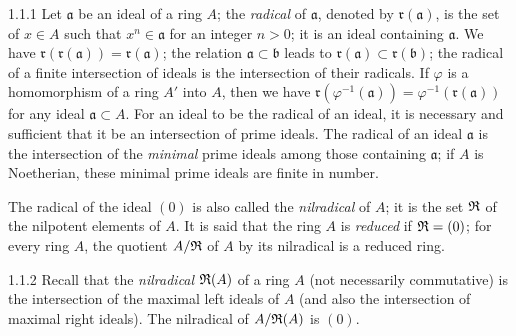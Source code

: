 
\begin{env}{1.1.1}
Let $\mathfrak{a}$ be an ideal of a ring $A$; the \emph{radical} of $\mathfrak{a}$, denoted
by $\mathfrak{r}(\mathfrak{a})$, is the set of $x\in A$ such that $x^n\in\mathfrak{a}$ for
an integer $n>0$; it is an ideal containing $\mathfrak{a}$. We have
$\mathfrak{r}(\mathfrak{r}(\mathfrak{a}))=\mathfrak{r}(\mathfrak{a})$; the relation
$\mathfrak{a}\subset\mathfrak{b}$ leads to $\mathfrak{r}(\mathfrak{a})\subset\mathfrak{r}(\mathfrak{b})$;
the radical of a finite intersection of ideals is the intersection of their radicals. If $\varphi$
is a homomorphism of a ring $A'$ into $A$, then we have
$\mathfrak{r}(\varphi^{-1}(\mathfrak{a}))=\varphi^{-1}(\mathfrak{r}(\mathfrak{a}))$
for any ideal $\mathfrak{a}\subset A$. For an ideal to be the radical of an ideal,
it is necessary and sufficient that it be an intersection of prime ideals. The radical of an
ideal $\mathfrak{a}$ is the intersection of the
\emph{minimal} prime ideals among those containing $\mathfrak{a}$; if $A$ is
Noetherian, these minimal prime ideals are finite in number.

The radical of the ideal $(0)$ is also called the \emph{nilradical} of $A$; it is the set
$\mathfrak{R}$ of the nilpotent elements of $A$. It is said that the ring $A$ is \emph{reduced} if
$\mathfrak{R}=(0)$; for every ring $A$, the quotient $A/\mathfrak{R}$ of $A$ by its nilradical is a
reduced ring.
\end{env}

\begin{env}{1.1.2}
Recall that the \emph{nilradical} $\mathfrak{R}(A)$ of a ring $A$ (not necessarily commutative) is the
intersection of the maximal left ideals of $A$ (and also the intersection of maximal
right ideals). The nilradical of $A/\mathfrak{R}(A)$ is $(0)$.
\end{env}

